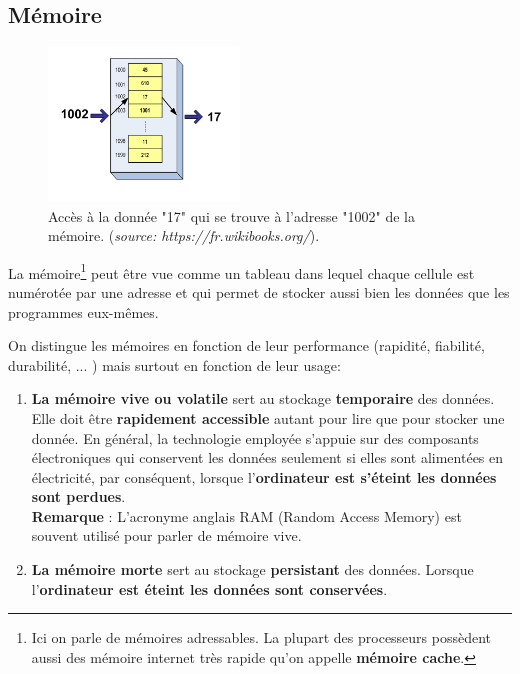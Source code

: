 \newpage
\subsection{Mémoire}
\begin{figure}
	\centering
	\includegraphics[trim=0 0 0 0,width=0.45\textwidth]{Images/ordinateur/adressage_memoire.png}
	\caption{Accès à la donnée "17" qui se trouve à l'adresse "1002" de la mémoire. (\textit{source: https://fr.wikibooks.org/}).}
\end{figure}
La mémoire\footnote{Ici on parle de mémoires adressables. La plupart des processeurs possèdent aussi des mémoire internet très rapide qu'on appelle \textbf{mémoire cache}.} peut être vue comme un tableau dans lequel chaque cellule est numérotée par une adresse et qui permet de stocker aussi bien les données que les programmes eux-mêmes.

On distingue les mémoires en fonction de leur performance (rapidité, fiabilité, durabilité, ... ) mais surtout en fonction de leur usage:
\begin{enumerate}
	\item \textbf{La mémoire vive ou volatile} sert au stockage \textbf{temporaire} des données. Elle doit être \textbf{rapidement accessible} autant pour lire que pour stocker une donnée. En général, la technologie employée s'appuie sur des composants électroniques qui conservent les données seulement si elles sont alimentées en électricité, par conséquent, lorsque l'\textbf{ordinateur est s'éteint les données sont perdues}. \\
	\textbf{Remarque} : L'acronyme anglais RAM (Random Access Memory) est souvent utilisé pour parler de mémoire vive.
	\item \textbf{La mémoire morte} sert au stockage \textbf{persistant} des données. Lorsque l'\textbf{ordinateur est éteint les données sont conservées}.
\end{enumerate}


